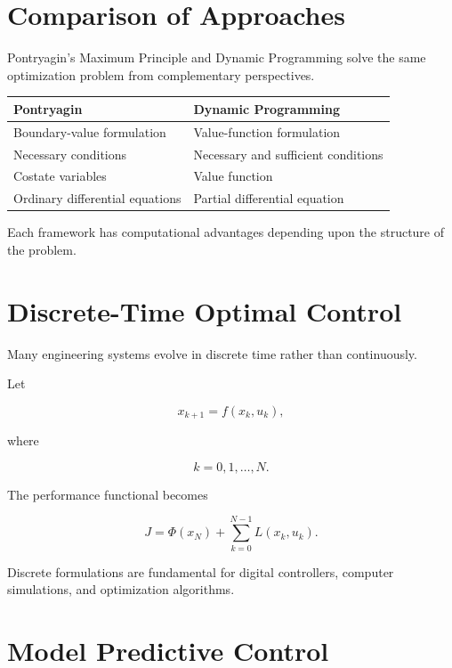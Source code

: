 \documentclass[11pt,fleqn]{book}
\numberwithin{equation}{chapter}
\theoremstyle{plain}
\theoremstyle{definition}
\theoremstyle{remark}
\begin{document}
\section{Comparison of Approaches}

Pontryagin's Maximum Principle and Dynamic Programming solve the same
optimization problem from complementary perspectives.

\begin{center}
\begin{tabular}{ll}
\toprule
Pontryagin & Dynamic Programming\\
\midrule
Boundary-value formulation & Value-function formulation\\
Necessary conditions & Necessary and sufficient conditions\\
Costate variables & Value function\\
Ordinary differential equations & Partial differential equation\\
\bottomrule
\end{tabular}
\end{center}

Each framework has computational advantages depending upon the structure
of the problem.

\section{Discrete-Time Optimal Control}

Many engineering systems evolve in discrete time rather than
continuously.

Let

\[
x_{k+1}
=
f(x_k,u_k),
\]

where

\[
k=0,1,\ldots,N.
\]

The performance functional becomes

\[
\boxed{
J
=
\Phi(x_N)
+
\sum_{k=0}^{N-1}
L(x_k,u_k).
}
\]

Discrete formulations are fundamental for digital controllers,
computer simulations, and optimization algorithms.


\section{Model Predictive Control}
\end{document}
